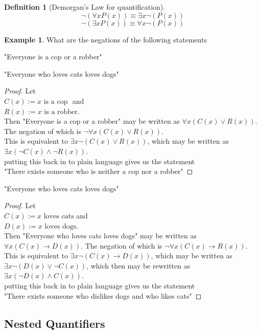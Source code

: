 \documentclass[letterpaper,10pt]{article}
\theoremstyle{plain}
\theoremstyle{definition}
\newtheorem{defn}[thm]{Definition}
\newtheorem{exmp}[thm]{Example}
\theoremstyle{remark}
\providecommand{\land}{\ensuremath{\wedge}}
\providecommand{\lor}{\ensuremath{\vee}}
\begin{document}
\begin{defn}[Demorgan's Law for quantification]

\[\lnot (\forall x P(x)) \equiv \exists x \lnot( P(x))\]
\[\lnot (\exists x P(x)) \equiv \forall x \lnot( P(x))\]

\end{defn}
\begin{exmp}

What are the negations of the following statements

"Everyone is a cop or a robber"

"Everyone who loves cats loves dogs"
\end{exmp}
\begin{proof}
Let 
\\$C(x):=\text{$x$ is a cop }$ and
\\$R(x):=\text{$x$ is a robber}$.
\\Then "Everyone is a cop or a robber" may be written as $\forall x (C(x) \lor R(x))$.
The negation of which is $\lnot \forall x (C(x) \lor R(x))$.
\\ This is equivalent to $\exists x \lnot (C(x) \lor R(x))$, which may be written as $\exists x (\lnot C(x) \land \lnot R(x))$.
\\ putting this back in to plain language gives us the statement
\\"There exists someone who is neither a cop nor a robber"
\end{proof}
"Everyone who loves cats loves dogs"
\begin{proof}
Let 
\\$C(x):=\text{$x$ loves cats}$ and
\\$D(x):=\text{$x$ loves dogs}$.
\\Then "Everyone who loves cats loves dogs" may be written as $\forall x (C(x) \to D(x))$.
The negation of which is $\lnot \forall x (C(x) \to R(x))$.
\\ This is equivalent to $\exists x \lnot (C(x) \to D(x))$, which may be written as $\exists x \lnot ( D(x) \lor \lnot C(x) )$, which then may be rewritten as $\exists x ( \lnot D(x) \land C(x) )$.
\\ putting this back in to plain language gives us the statement
\\"There exists someone who dislikes dogs and who likes cats"
\end{proof}

\subsection{Nested Quantifiers}
\end{document}
